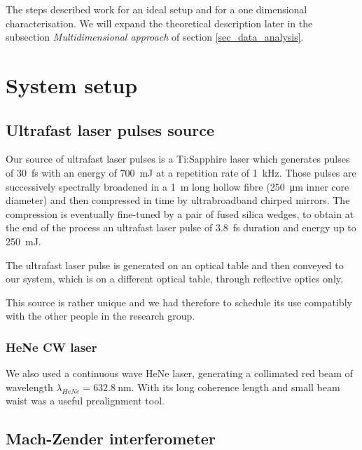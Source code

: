 \documentclass[12pt,a4paper,twoside]{article}
\begin{document}
The steps described work for an ideal setup and for a one dimensional characterisation.
We will expand the theoretical description later in the subsection \textit{Multidimensional approach} of section \ref{sec_data_analysis}.

\section{System setup}
\subsection{Ultrafast laser pulses source}
Our source of ultrafast laser pulses is a Ti:Sapphire laser which generates pulses of \SI{30}{\fs} with an energy of \SI{700}{\milli\J} at a repetition rate of \SI{1}{\kHz}.
Those pulses are successively spectrally broadened in a \SI{1}{\m} long hollow fibre (\SI{250}{\um} inner core diameter) and then compressed in time by ultrabroadband chirped mirrors.
The compression is eventually fine-tuned by a pair of fused silica wedges, to obtain at the end of the process an ultrafast laser pulse of \SI{3.8}{\fs} duration and energy up to \SI{250}{\milli\J}.

The ultrafast laser pulse is generated on an optical table and then conveyed to our system, which is on a different optical table, through reflective optics only.

This source is rather unique and we had therefore to schedule its use compatibly with the other people in the research group.

\subsubsection*{HeNe CW laser}
We also used a continuous wave HeNe laser, generating a collimated red beam of wavelength $\lambda_{HeNe}=\SI{632.8}{\nm}$.
With its long coherence length and small beam waist was a useful prealignment tool.

\subsection{Mach-Zender interferometer}

\end{document}
